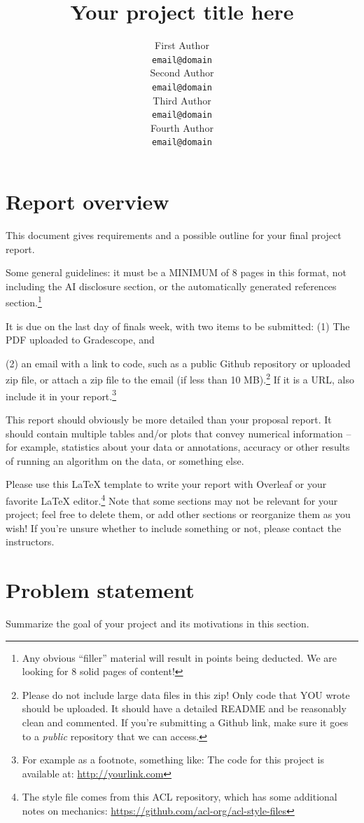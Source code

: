 \documentclass[11pt,a4paper]{article}
\title{Your project title here}
\author{First Author \\
  {\tt email@domain} \\\And
  Second Author \\
  {\tt email@domain} \\\And
  Third Author \\
  {\tt email@domain} \\\And
  Fourth Author \\
  {\tt email@domain} \\}
\date{}
\begin{document}
\maketitle

\section*{Report overview}
This document gives requirements and a possible outline for your final project report.

Some general guidelines: it must be a MINIMUM of 8 pages in this format,
not including the AI disclosure section, or the automatically generated references section.\footnote{Any obvious ``filler'' material will result in points being deducted. We are looking for 8 solid pages of content!} 

It is due on the last day of finals week, with two items to be submitted:  
(1) The PDF uploaded to Gradescope, and 

(2) an email with a link to code, such as a public Github repository or uploaded zip file, or attach a zip file to the email (if less than 10 MB).\footnote{Please do not include large data files in this zip! Only code that YOU wrote should be uploaded. It should have a detailed README and be reasonably clean and commented. If you're submitting a Github link, make sure it goes to a \emph{public} repository that we can access.}
If it is a URL, also include it in your report.\footnote{For example as a footnote, something like: The code for this project is available at: \url{http://yourlink.com}}

This report should obviously be more detailed than your proposal report.  It should contain multiple tables and/or plots that convey numerical information – for example, statistics about your data or annotations, accuracy or other results of running an algorithm on the data, or something else. 

Please use this LaTeX template to write your report with Overleaf or your favorite LaTeX editor.\footnote{The style file comes from this ACL repository, which has some additional notes on mechanics: \url{https://github.com/acl-org/acl-style-files}}
Note that some sections may not be relevant for your project; feel free to delete them, or add other sections or reorganize them as you wish! If you're unsure whether to include something or not, please contact the instructors.


\section{Problem statement}
Summarize the goal of your project and its motivations in this section.
\end{document}
